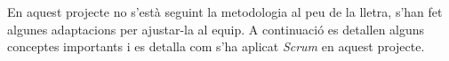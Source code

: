 En aquest projecte no s'està seguint la metodologia al peu de la lletra, s'han fet algunes adaptacions per ajustar-la al equip. A continuació es detallen alguns conceptes importants i es detalla com s'ha aplicat \textit{Scrum} en aquest projecte.




















